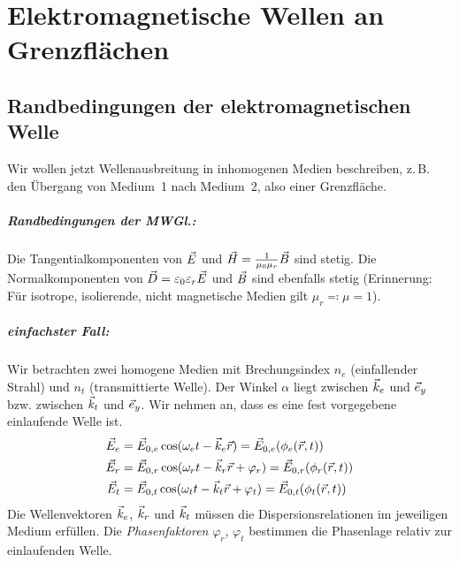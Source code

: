 




\chapter{Elektromagnetische Wellen an Grenzflächen}
\section{Randbedingungen der elektromagnetischen Welle}
Wir wollen jetzt Wellenausbreitung in inhomogenen Medien beschreiben,
z.\,B. den Übergang von Medium~1 nach Medium~2, also einer
Grenzfläche.

\paragraph{Randbedingungen der MWGl.:} Die Tangentialkomponenten von
$\vec{E}$ und $\vec{H}=\frac{1}{\mu_0\mu_r}\vec{B}$ sind stetig. Die
Normalkomponenten von $\vec{D}=\varepsilon_0\varepsilon_r\vec{E}$ und $\vec{B}$ sind
ebenfalls stetig (Erinnerung: Für isotrope, isolierende, nicht
magnetische Medien gilt $\mu_r\eqqcolon\mu=1$).
\paragraph{einfachster Fall:} Wir betrachten zwei homogene Medien mit
Brechungsindex $n_e$ (einfallender Strahl) und $n_t$ (transmittierte
Welle).
% 
% 
Der Winkel $\alpha$ liegt zwischen $\vec{k}_e$ und $\vec{e}_y$
bzw. zwischen $\vec{k}_t$ und $\vec{e}_y$. Wir nehmen an, dass es eine
fest vorgegebene einlaufende Welle ist.
\begin{align*}
  \vec{E}_e &= \vec{E}_{0,e}\cos(\omega_et-\vec{k}_e\vec{r})
            =\vec{E}_{0,e}(\phi_e(\vec{r},t))\\
  \vec{E}_r &= \vec{E}_{0,r}\cos(\omega_rt - \vec{k}_r\vec{r}+\varphi_r)
            =\vec{E}_{0,r}(\phi_r(\vec{r},t))\\
  \vec{E}_t &= \vec{E}_{0,t}\cos(\omega_tt - \vec{k}_t\vec{r} + \varphi_t)
            =\vec{E}_{0,t}(\phi_t(\vec{r},t))
\end{align*}
Die Wellenvektoren $\vec{k}_e$, $\vec{k}_r$ und $\vec{k}_t$ müssen die%
%
%
Dispersionsrelationen im jeweiligen Medium erfüllen. Die
\emph{Phasenfaktoren}
$\varphi_r$, $\varphi_t$%
%
bestimmen die Phasenlage relativ zur einlaufenden Welle.

